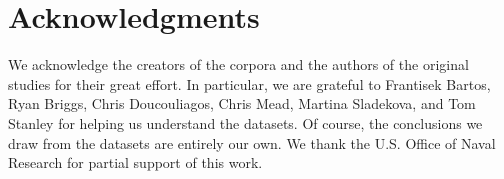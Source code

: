 \documentclass[11pt]{article}
\begin{document}

\section{Acknowledgments}
We acknowledge the creators of the corpora and the authors of the original studies for their great effort. In particular, we are grateful to Frantisek Bartos, Ryan Briggs, Chris Doucouliagos, Chris Mead, Martina Sladekova, and Tom Stanley for helping us understand the datasets. Of course, the conclusions we draw from the datasets are entirely our own. We thank the U.S. Office of Naval Research for partial support of this work.


\end{document}
